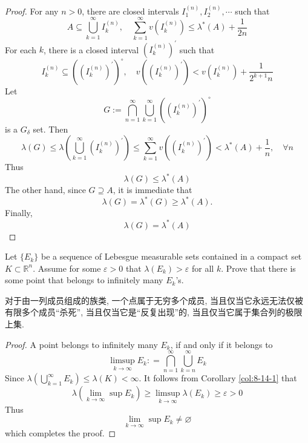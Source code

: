 \documentclass[../main.tex]{subfiles}
\begin{document}
 \begin{proof}
    For any \(  n > 0  \), there are closed intervals \(  I_1^{\left( n \right) },I_2^{\left( n \right) },\cdots   \) such that \[
    A\subseteq \bigcup _{k = 1}^{\infty}I _{k}^{\left( n \right) },\quad \sum _{k = 1}^{\infty}v\left(  I _{k}^{\left( n \right) } \right)\le  \lambda ^{*}\left( A \right)+ \frac{ 1  }{2n }   
    \] For each \(  k  \), there is a closed interval   \(  \left( I^{\left( n \right) }_{k} \right)^{\prime}  \) such that \[
    I _{k}^{\left( n \right) }\subseteq \left(  \left( I^{\left( n \right) }_{k} \right)^{\prime} \right)^{\circ },\quad v\left(\left( I^{\left( n \right) }_{k} \right)^{\prime} \right)< v\left(I _{k}^{\left( n \right) }  \right)+ \frac{1  }{2^{k+ 1}n }    
    \] Let  \[
    G:= \bigcap_{n = 1}^{\infty} \bigcup _{k = 1}^{\infty} \left( \left( I^{\left( n \right) }_{k} \right)^{\prime}   \right)^{\circ}  
    \] is a \(  G_{ \delta }  \) set. Then \[
     \lambda \left( G \right)\le  \lambda \left( \bigcup _{k = 1}^{\infty} \left( I^{\left( n \right) }_{k} \right)^{\prime}   \right)  \le \sum _{k = 1}^{\infty}v\left( \left( I^{\left( n \right) }_{k} \right)^{\prime}   \right)<  \lambda ^{*}\left( A \right)+ \frac{1 }{n },\quad \forall n   
    \] Thus \[
     \lambda \left( G \right)\le  \lambda ^{*}\left( A \right)  
    \] The other hand, since \(  G\supseteq A  \), it is immediate that \[
     \lambda \left( G \right)=  \lambda ^{*}\left( G \right)\ge  \lambda ^{*}\left( A \right) .   
    \] Finally, \[
     \lambda \left( G \right)=  \lambda ^{*}\left( A \right)  
    \] 
 \end{proof}

 
\begin{exercise}{}{}
Let $\{E_k\}$ be a sequence of Lebesgue measurable sets contained in a compact set $K \subset \mathbb{R}^n$. Assume for some $\varepsilon > 0$ that $\lambda(E_k) > \varepsilon$ for all $k$. Prove that there is some point that belongs to infinitely many $E_k$'s.
\end{exercise}

\begin{note}
    对于由一列成员组成的族类, 一个点属于无穷多个成员, 当且仅当它永远无法仅被有限多个成员``杀死'', 当且仅当它是``反复出现''的, 当且仅当它属于集合列的极限上集.  
\end{note}

\begin{proof}
   A point belongs to infinitely many \(  E_{k}  \), if and only if it belongs to \[
   \limsup_{k\to \infty}E_{k}: = \bigcap_{n = 1}^{\infty} \bigcup _{k = n}^{\infty}E_{k} 
   \] Since  \(   \lambda \left( \bigcup _{k = 1}^{\infty}E_{k} \right)\le  \lambda \left( K \right)< \infty    \). It follows from Corollary \ref{col:8-14-1} that \[
    \lambda \left( \lim_{k\to \infty}\sup E_{k} \right)\ge  \limsup_{k\to \infty} \lambda \left( E_{k} \right)  \ge  \varepsilon > 0
   \] Thus \[
   \lim_{k\to \infty}\sup E_{k}\neq \varnothing
   \] which completes the proof. 
\end{proof}
\end{document}
